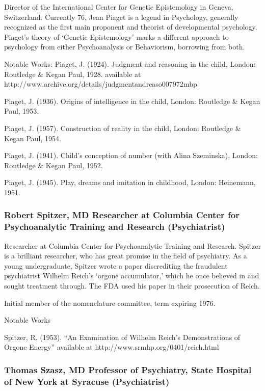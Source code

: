 Director of the International Center for Genetic Epistemology in Geneva, Switzerland. Currently 76, Jean Piaget is a legend in Psychology, generally recognized as the first main proponent and theorist of developmental psychology. Piaget's theory of `Genetic Epistemology' marks a different approach to psychology from either Psychoanalysis or Behaviorism, borrowing from both.

Notable Works:
Piaget, J. (1924). Judgment and reasoning in the child, London: Routledge \& Kegan Paul, 1928. available at http:\slash \slash www.archive.org\slash details\slash judgmentandreaso007972mbp

Piaget, J. (1936). Origins of intelligence in the child, London: Routledge \& Kegan Paul, 1953.

Piaget, J. (1957). Construction of reality in the child, London: Routledge \& Kegan Paul, 1954.

Piaget, J. (1941). Child's conception of number (with Alina Szeminska), London: Routledge \& Kegan Paul, 1952.

Piaget, J. (1945). Play, dreams and imitation in childhood, London: Heinemann, 1951.

\subsubsection{Robert Spitzer, MD Researcher at Columbia Center for Psychoanalytic Training and Research (Psychiatrist)}
\label{robertspitzermdresearcheratcolumbiacenterforpsychoanalytictrainingandresearchpsychiatrist}

Researcher at Columbia Center for Psychoanalytic Training and Research. Spitzer is a brilliant researcher, who has great promise in the field of psychiatry. As a young undergraduate, Spitzer wrote a paper discrediting the fraudulent psychiatrist Wilhelm Reich's `orgone accumulator,' which he once believed in and sought treatment through. The FDA used his paper in their prosecution of Reich.

Initial member of the nomenclature committee, term expiring 1976.

Notable Works

Spitzer, R. (1953). “An Examination of Wilhelm Reich's Demonstrations of Orgone Energy” available at http:\slash \slash www.srmhp.org\slash 0401\slash reich.html

\subsubsection{Thomas Szasz, MD Professor of Psychiatry, State Hospital of New York at Syracuse (Psychiatrist)}
\label{thomasszaszmdprofessorofpsychiatrystatehospitalofnewyorkatsyracusepsychiatrist}

